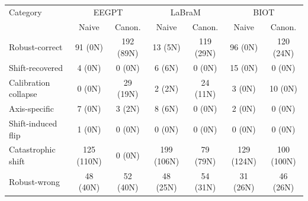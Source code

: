 \begin{tabular}{lcccccc}
\toprule
Category & \multicolumn{2}{c}{EEGPT} & \multicolumn{2}{c}{LaBraM} & \multicolumn{2}{c}{BIOT} \\
 & Naive & Canon. & Naive & Canon. & Naive & Canon. \\
\midrule
Robust-correct & 91 (0N) & 192 (89N) & 13 (5N) & 119 (29N) & 96 (0N) & 120 (24N) \\
Shift-recovered & 4 (0N) & 0 (0N) & 6 (6N) & 0 (0N) & 15 (0N) & 0 (0N) \\
Calibration collapse & 0 (0N) & 29 (19N) & 2 (2N) & 24 (11N) & 3 (0N) & 10 (0N) \\
Axis-specific & 7 (0N) & 3 (2N) & 8 (6N) & 0 (0N) & 2 (0N) & 0 (0N) \\
Shift-induced flip & 1 (0N) & 0 (0N) & 0 (0N) & 0 (0N) & 0 (0N) & 0 (0N) \\
Catastrophic shift & 125 (110N) & 0 (0N) & 199 (106N) & 79 (79N) & 129 (124N) & 100 (100N) \\
Robust-wrong & 48 (40N) & 52 (40N) & 48 (25N) & 54 (31N) & 31 (26N) & 46 (26N) \\
\bottomrule
\end{tabular}
